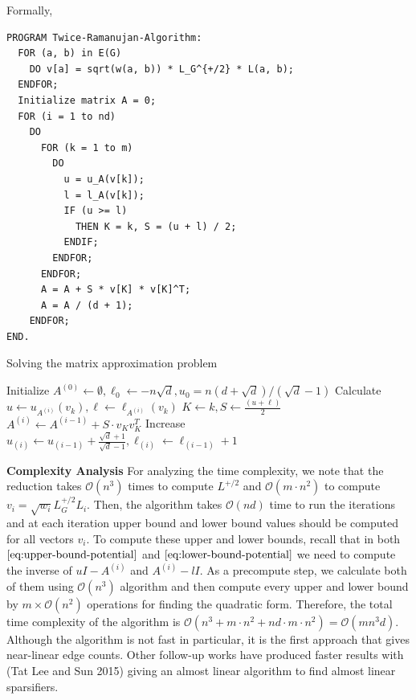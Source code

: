\documentclass[
  letterpaper,
  DIV=11,
  numbers=noendperiod]{scrartcl}
\theoremstyle{plain}
\theoremstyle{plain}
\theoremstyle{plain}
\theoremstyle{definition}
\theoremstyle{remark}
\begin{document}
Formally,

\begin{verbatim}
PROGRAM Twice-Ramanujan-Algorithm:
  FOR (a, b) in E(G)
    DO v[a] = sqrt(w(a, b)) * L_G^{+/2} * L(a, b);
  ENDFOR;
  Initialize matrix A = 0;
  FOR (i = 1 to nd)
    DO
      FOR (k = 1 to m)
        DO
          u = u_A(v[k]);
          l = l_A(v[k]);
          IF (u >= l)
            THEN K = k, S = (u + l) / 2;
          ENDIF;
        ENDFOR;
      ENDFOR;
      A = A + S * v[K] * v[K]^T;
      A = A / (d + 1);
    ENDFOR;
END.
\end{verbatim}

\begin{algorithm}[H]
\caption{Solving the matrix approximation problem}\label{alg:cap}
\begin{algorithmic}
\State Initialize $A^{(0)} \gets \emptyset , \ell_0 \gets -n\sqrt{d}, u_0 = n(d + \sqrt{d})/ (\sqrt{d} - 1)$
        \State Calculate $u \gets u_{A^{(i)}}(v_k), \ell \gets \ell_{A^{(i)}}(v_k)$
            \State $K \gets k, S \gets \frac{(u + \ell)}{2}$
        \EndIf
    \EndFor
    \State $A^{(i)} \gets A^{(i-1)} + S \cdot v_Kv_K^T$ 
    \State Increase $u_{(i)}\gets  u_{(i-1)} + \frac{\sqrt{d} + 1}{\sqrt{d} - 1},  \ell_{(i)} \gets \ell_{(i-1)} + 1$
\EndFor
\end{algorithmic}
\end{algorithm}

\textbf{Complexity Analysis} For analyzing the time complexity, we note
that the reduction takes \(\mathcal{O}(n^3)\) times to compute
\(L^{+/2}\) and \(\mathcal{O}(m \cdot n^2)\) to compute
\(v_i = \sqrt{w_i} L_G^{+/2} L_i\). Then, the algorithm takes
\(\mathcal{O}(nd)\) time to run the iterations and at each iteration
upper bound and lower bound values should be computed for all vectors
\(v_i\). To compute these upper and lower bounds, recall that in both
\(\eqref{eq:upper-bound-potential}\) and
\(\eqref{eq:lower-bound-potential}\) we need to compute the inverse of
\(uI - A^{(i)}\) and \(A^{(i)} - l I\). As a precompute step, we
calculate both of them using \(\mathcal{O}(n^3)\) algorithm and then
compute every upper and lower bound by \(m \times \mathcal{O}(n^2)\)
operations for finding the quadratic form. Therefore, the total time
complexity of the algorithm is
\(\mathcal{O}(n^3 + m \cdot n^2 + nd \cdot m \cdot n^2) = \mathcal{O}(m n^3 d)\).
Although the algorithm is not fast in particular, it is the first
approach that gives near-linear edge counts. Other follow-up works have
produced faster results with (Tat Lee and Sun 2015) giving an almost
linear algorithm to find almost linear sparsifiers.
\end{document}
